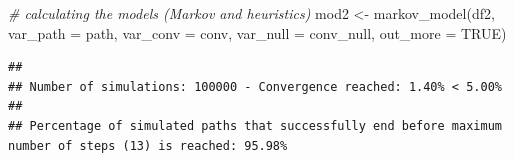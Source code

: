 \documentclass[
]{book}
\newenvironment{Shaded}{\begin{snugshade}}{\end{snugshade}}
\newcommand{\AttributeTok}[1]{\textcolor[rgb]{0.77,0.63,0.00}{#1}}
\newcommand{\CommentTok}[1]{\textcolor[rgb]{0.56,0.35,0.01}{\textit{#1}}}
\newcommand{\ConstantTok}[1]{\textcolor[rgb]{0.00,0.00,0.00}{#1}}
\newcommand{\FunctionTok}[1]{\textcolor[rgb]{0.00,0.00,0.00}{#1}}
\newcommand{\NormalTok}[1]{#1}
\newcommand{\OtherTok}[1]{\textcolor[rgb]{0.56,0.35,0.01}{#1}}
\newcommand{\StringTok}[1]{\textcolor[rgb]{0.31,0.60,0.02}{#1}}
\begin{document}
\begin{Shaded}
\begin{Highlighting}[]
\CommentTok{\# calculating the models (Markov and heuristics)}
\NormalTok{mod2 }\OtherTok{\textless{}{-}} \FunctionTok{markov\_model}\NormalTok{(df2,}
                     \AttributeTok{var\_path =} \StringTok{\textquotesingle{}path\textquotesingle{}}\NormalTok{,}
                     \AttributeTok{var\_conv =} \StringTok{\textquotesingle{}conv\textquotesingle{}}\NormalTok{,}
                     \AttributeTok{var\_null =} \StringTok{\textquotesingle{}conv\_null\textquotesingle{}}\NormalTok{,}
                     \AttributeTok{out\_more =} \ConstantTok{TRUE}\NormalTok{)}
\end{Highlighting}
\end{Shaded}

\begin{verbatim}
## 
## Number of simulations: 100000 - Convergence reached: 1.40% < 5.00%
## 
## Percentage of simulated paths that successfully end before maximum number of steps (13) is reached: 95.98%
\end{verbatim}
\end{document}

